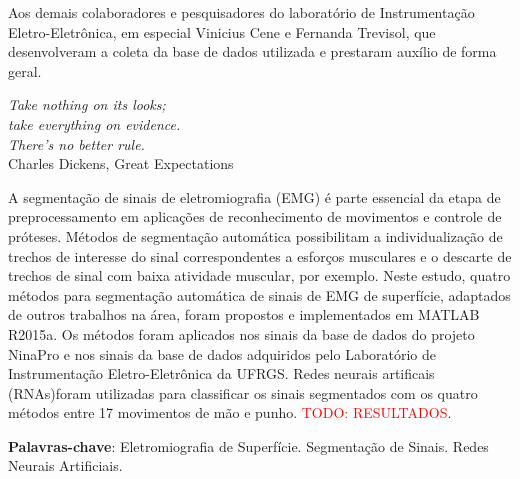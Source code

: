 
\begin{agradecimentos}
	Aos demais colaboradores e pesquisadores do laboratório de Instrumentação Eletro-Eletrônica, em especial Vinicius Cene e Fernanda Trevisol, que desenvolveram a coleta da base de dados utilizada e prestaram auxílio de forma geral.
\end{agradecimentos}


\begin{epigrafe}
    \vspace*{\fill}
	\begin{flushright}
		\textit{Take nothing on its looks;\\ take everything on evidence.\\ There's no better rule.}\\ \vspace{\onelineskip}
		Charles Dickens, Great Expectations
	\end{flushright}
\end{epigrafe}


\setlength{\absparsep}{18pt} %
\begin{resumo}

	A segmentação de sinais de eletromiografia (EMG) é parte essencial da etapa de preprocessamento em aplicações de reconhecimento de movimentos e controle de próteses. Métodos de segmentação automática possibilitam a individualização de trechos de interesse do sinal correspondentes a esforços musculares e o descarte de trechos de sinal com baixa atividade muscular, por exemplo. Neste estudo, quatro métodos para segmentação automática de sinais de EMG de superfície, adaptados de outros trabalhos na área, foram propostos e implementados em MATLAB R2015a. Os métodos foram aplicados nos sinais da base de dados do projeto NinaPro e nos sinais da base de dados adquiridos pelo Laboratório de Instrumentação Eletro-Eletrônica da UFRGS. Redes neurais artificais (RNAs)foram utilizadas para classificar os sinais segmentados com os quatro métodos entre 17 movimentos de mão e punho. \textcolor{red}{TODO: RESULTADOS}.

	\vspace{\onelineskip}
	\textbf{Palavras-chave}: Eletromiografia de Superfície. Segmentação de Sinais. Redes Neurais Artificiais.
\end{resumo}

